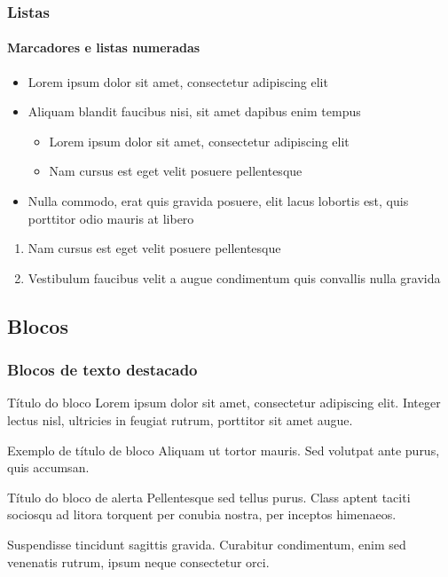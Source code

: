 \begin{frame}
	\frametitle{Listas}
	\framesubtitle{Marcadores e listas numeradas} %
	
	\begin{itemize}
		\item Lorem ipsum dolor sit amet, consectetur adipiscing elit
		\item Aliquam blandit faucibus nisi, sit amet dapibus enim tempus
		\begin{itemize}
			\item Lorem ipsum dolor sit amet, consectetur adipiscing elit
			\item Nam cursus est eget velit posuere pellentesque
		\end{itemize}
		\item Nulla commodo, erat quis gravida posuere, elit lacus lobortis est, quis porttitor odio mauris at libero
	\end{itemize}
	
	\bigskip %
	
	\begin{enumerate}
		\item Nam cursus est eget velit posuere pellentesque
		\item Vestibulum faucibus velit a augue condimentum quis convallis nulla gravida 
	\end{enumerate}
\end{frame}


\subsection{Blocos}

\begin{frame}
	\frametitle{Blocos de texto destacado}
	
	\begin{block}{Título do bloco}
		Lorem ipsum dolor sit amet, consectetur adipiscing elit. Integer lectus nisl, ultricies in feugiat rutrum, porttitor sit amet augue.
	\end{block}
	
	\begin{exampleblock}{Exemplo de título de bloco}
		Aliquam ut tortor mauris. Sed volutpat ante purus, quis accumsan.
	\end{exampleblock}
	
	\begin{alertblock}{Título do bloco de alerta}
		Pellentesque sed tellus purus. Class aptent taciti sociosqu ad litora torquent per conubia nostra, per inceptos himenaeos.
	\end{alertblock}
	
	\begin{block}{} %
		Suspendisse tincidunt sagittis gravida. Curabitur condimentum, enim sed venenatis rutrum, ipsum neque consectetur orci.
	\end{block}
\end{frame}

